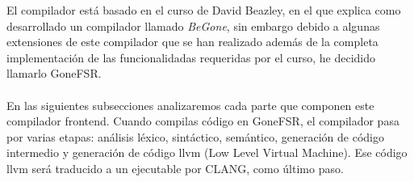 






El compilador está basado en el curso de David Beazley, en el que explica como desarrollado un compilador llamado \textit{BeGone}, sin embargo debido a algunas extensiones de este compilador que se han realizado además de la completa implementación de las funcionalidadas requeridas por el curso, he decidido llamarlo GoneFSR. \\\\
En las siguientes subsecciones analizaremos cada parte que componen este compilador frontend. Cuando compilas código en GoneFSR, el compilador pasa por varias etapas: análisis léxico, sintáctico, semántico, generación de código intermedio y generación de código llvm (Low Level Virtual Machine). Ese código llvm será traducido a un ejecutable por CLANG, como último paso. 
